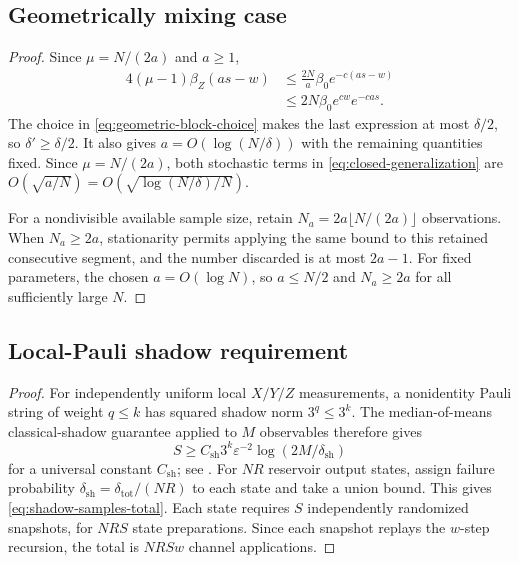 \subsection{Geometrically mixing case}

\begin{proof}
Since \(\mu=N/(2a)\) and \(a\geq1\),
\begin{align*}
    4(\mu-1)\beta_Z(as-w)
    &\leq
    \frac{2N}{a}\beta_0e^{-c(as-w)}\\
    &\leq
    2N\beta_0e^{cw}e^{-cas}.
\end{align*}
The choice in \cref{eq:geometric-block-choice} makes the last expression at
most \(\delta/2\), so \(\delta'\geq\delta/2\). It also gives
\(a=O(\log(N/\delta))\) with the remaining quantities fixed. Since
\(\mu=N/(2a)\), both stochastic terms in
\cref{eq:closed-generalization} are
\(O(\sqrt{a/N})=O(\sqrt{\log(N/\delta)/N})\).

For a nondivisible available sample size, retain
\(N_a=2a\lfloor N/(2a)\rfloor\) observations. When \(N_a\geq2a\), stationarity
permits applying the same bound to this retained consecutive segment, and the
number discarded is at most \(2a-1\). For fixed parameters, the chosen
\(a=O(\log N)\), so \(a\leq N/2\) and \(N_a\geq2a\) for all sufficiently
large \(N\).
\end{proof}

\subsection{Local-Pauli shadow requirement}

\begin{proof}
For independently uniform local \(X/Y/Z\) measurements, a nonidentity
Pauli string of weight \(q\leq k\) has squared shadow norm
\(3^q\leq3^k\). The median-of-means classical-shadow guarantee applied to
\(M\) observables therefore gives
\[
    S
    \geq
    C_{\mathrm{sh}}3^k\varepsilon^{-2}
    \log(2M/\delta_{\mathrm{sh}})
\]
for a universal constant \(C_{\mathrm{sh}}\); see
\citet{HuangKuengPreskill2020}. For \(NR\) reservoir output states, assign failure probability
\(\delta_{\mathrm{sh}}=\delta_{\mathrm{tot}}/(NR)\) to each state and take a
union bound. This gives \cref{eq:shadow-samples-total}. Each state requires
\(S\) independently randomized snapshots, for \(NRS\) state preparations.
Since each snapshot replays the \(w\)-step recursion, the total is \(NRSw\)
channel applications.
\end{proof}

